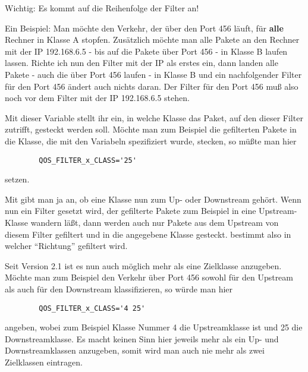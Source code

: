 \begin{description}
   Wichtig: Es kommt auf die Reihenfolge der Filter an!

   Ein Beispiel: Man möchte den Verkehr, der über den Port 456 läuft,
   für \textbf{alle} Rechner in Klasse A stopfen. Zusätzlich möchte man
   alle Pakete an den Rechner mit der IP 192.168.6.5 - bis auf die
   Pakete über Port 456 - in Klasse B laufen lassen.  Richte ich nun
   den Filter mit der IP als erstes ein, dann landen alle Pakete -
   auch die über Port 456 laufen - in Klasse B und ein nachfolgender
   Filter für den Port 456 ändert auch nichts daran. Der Filter für
   den Port 456 muß also noch vor dem Filter mit der IP 192.168.6.5
   stehen.



   Mit dieser Variable stellt ihr ein, in welche Klasse das Paket, auf
   den dieser Filter zutrifft, gesteckt werden soll. Möchte man zum
   Beispiel die gefilterten Pakete in die Klasse, die mit den Variabeln
    spezifiziert wurde, stecken, so müßte man
   hier

\begin{example}
\begin{verbatim}
        QOS_FILTER_x_CLASS='25'
\end{verbatim}
\end{example}


   setzen.

   Mit  gibt man ja an, ob eine Klasse nun zum Up-
   oder Downstream gehört. Wenn nun ein Filter gesetzt wird, der
   gefilterte Pakete zum Beispiel in eine Upstream-Klasse wandern läßt,
   dann werden auch nur Pakete aus dem Upstream von diesem Filter
   gefiltert und in die angegebene Klasse gesteckt. 
   bestimmt also in welcher ``Richtung'' gefiltert wird.

   Seit Version 2.1 ist es nun auch möglich mehr als eine Zielklasse
   anzugeben. Möchte man zum Beispiel den Verkehr über Port 456 sowohl
   für den Upstream als auch für den Downstream klassifizieren, so würde
   man hier

\begin{example}
\begin{verbatim}
        QOS_FILTER_x_CLASS='4 25'
\end{verbatim}
\end{example}

   angeben, wobei zum Beispiel Klasse Nummer 4 die Upstreamklasse ist und
   25 die Downstreamklasse. Es macht keinen Sinn hier jeweils mehr als
   ein Up- und Downstreamklassen anzugeben, somit wird man auch
   nie mehr als zwei Zielklassen eintragen.



\end{description}
